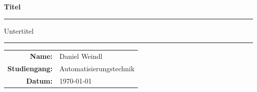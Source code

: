 \documentclass[a4paper,12pt,oneside]{book}
\begin{document}
\begin{titlepage}
    \centering

    \vspace*{2cm}
    {\LARGE \bfseries Titel \par}

    \vspace{0.8cm}
    \rule{0.8\textwidth}{0.6pt}

    \vspace{0.8cm}
    {\large Untertitel \par}

    \vspace{1.2cm}
    \rule{0.6\textwidth}{0.4pt}

    \vfill
    \begin{tabular}{rl}
        \textbf{Name:} & Daniel Weindl \\
        \textbf{Studiengang:} & Automatisierungstechnik \\
        \textbf{Datum:} & \today \\
    \end{tabular}

    \vspace{1.5cm}

\end{titlepage}

\setcounter{page}{1}
\tableofcontents


\end{document}
